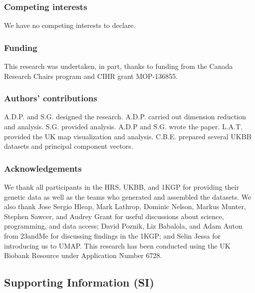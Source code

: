 \documentclass[12pt]{pnas-new}
\newcommand{\beginsupplement}{%
        \setcounter{table}{0}
        \renewcommand{\thetable}{S\arabic{table}}%
        \setcounter{figure}{0}
        \renewcommand{\thefigure}{S\arabic{figure}}%
     }
\begin{document}
\subsubsection*{Competing interests}
We have no competing interests to declare.

\subsubsection*{Funding}
This research was undertaken, in part, thanks to funding from the Canada Research Chairs program and CIHR grant MOP-136855.

\subsubsection*{Authors' contributions}
A.D.P. and S.G. designed the research. A.D.P. carried out dimension reduction and analysis. S.G. provided analysis. A.D.P and S.G. wrote the paper. L.A.T. provided the UK map visualization and analysis. C.B.E. prepared several UKBB datasets and principal component vectors.

\subsubsection*{Acknowledgements}
We thank all participants in the HRS, UKBB, and 1KGP for providing their genetic data as well as the teams who generated and assembled the datasets. We also thank Jose Sergio Hleap, Mark Lathrop, Dominic Nelson, Markus Munter, Stephen Sawcer, and Audrey Grant for useful discussions about science, programming, and data access; David Poznik, Liz Babalola, and Adam Auton from 23andMe for discussing findings in the 1KGP; and Selin Jessa for introducing us to UMAP. This research has been conducted using the UK Biobank Resource under Application Number 6728.



\newpage

\beginsupplement
\subsection*{Supporting Information (SI)}
\end{document}
